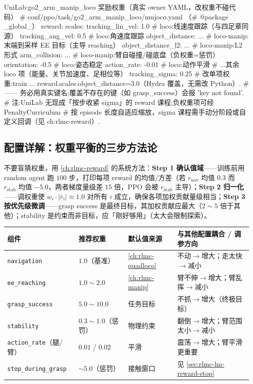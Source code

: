 \begin{codebox}[text]{UniLab:go2\_arm\_manip\_loco 奖励权重（真实 owner YAML，改权重不碰代码）}
# conf/ppo/task/go2_arm_manip_loco/mujoco.yaml （# @package _global_）
reward:
  scales:
    tracking_lin_vel:   1.0        # loco:线速度跟踪（与四足章同源）
    tracking_ang_vel:   0.5        # loco:角速度跟踪
    object_distance:    ...        # loco-manip:末端到采样 EE 目标（主导 reaching）
    object_distance_l2: ...        # loco-manip:L2 形式
    arm_collision:      ...        # loco-manip:臂自碰撞/碰底盘（负权重=惩罚）
    orientation:       -0.5        # loco:姿态稳定
    action_rate:       -0.01       # loco:动作平滑
    # ...其余 loco 项（能量、关节加速度、足相位等）
  tracking_sigma: 0.25
# 改单项权重:train ... reward.scales.object_distance=3.0（Hydra 覆盖，无需改 Python）.
#   —— 务必用真实键名;覆盖不存在的键（如 grasp_success）会报 'key not found'.
# 注:UniLab 无现成「按步收紧 sigma」的 reward 课程;负权重项可经 PenaltyCurriculum
#     按 episode 长度自适应缩放，sigma 课程需手动分阶段或自定义回调（见 ch:rlmc-reward）.
\end{codebox}

\subsection{配置详解：权重平衡的三步方法论}
\label{sec:rlmc-lm-reward-weight}

不要盲猜权重，用 \cref{ch:rlmc-reward} 的系统方法：\textbf{Step 1 确认值域}——训练前用 random agent 跑 $100$ 步，打印每项 reward 的均值/方差（若 $r_{\text{nav}}$ 均值 $0.3$ 而 $r_{\text{stab}}$ 均值 $-5.0$，两者梯度量级差 $15$ 倍，PPO 会被 $r_{\text{stab}}$ 主导）；\textbf{Step 2 归一化}——调权重使 $w_i\cdot|\bar r_i|\approx 1.0$ 对所有 $i$ 成立，确保各项加权贡献量级相当；\textbf{Step 3 按优先级微调}——grasp success 是最终目标，其加权贡献应最大（$2\!\sim\!5$ 倍于其他）；stability 是约束而非目标，应「刚好够用」（太大会限制探索）。

\begin{center}
\small
\begin{tabular}{@{}llll@{}}
\toprule
组件 & 推荐权重 & 默认值来源 & 与其他配置耦合 / 调参方向 \\
\midrule
\texttt{navigation} & $1.0$（基准） & \cref{ch:rlmc-quadloco} & 不动$\to$增大；走太快$\to$减小 \\
\texttt{ee\_reaching} & $1.0\!\sim\!2.0$ & \cref{ch:rlmc-manip} & 臂不伸$\to$增大；臂乱挥$\to$减小 \\
\texttt{grasp\_success} & $5.0\!\sim\!10.0$ & 任务目标 & 不抓$\to$增大（终极目标） \\
\texttt{stability} & $0.3\!\sim\!1.0$（惩罚） & 物理约束 & 翻倒$\to$增大；臂范围太小$\to$减小 \\
\texttt{action\_rate}（腿/臂） & $0.01$ / $0.02$ & 平滑 & 震荡$\to$增大；臂平滑更重要 \\
\texttt{stop\_during\_grasp} & $\sim\!5.0$（惩罚） & 接触窗口 & 见 \cref{sec:rlmc-lm-reward-stop} \\
\bottomrule
\end{tabular}
\end{center}

